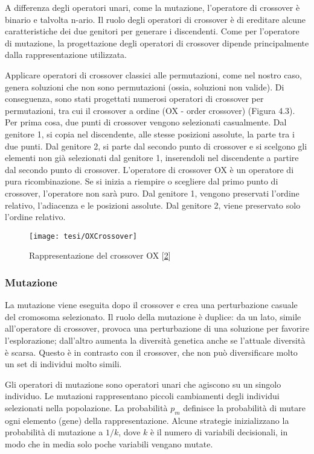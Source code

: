 A differenza degli operatori unari, come la mutazione, l'operatore di crossover è binario e talvolta n-ario. Il ruolo degli operatori di crossover è di ereditare alcune caratteristiche dei due genitori per generare i discendenti. Come per l'operatore di mutazione, la progettazione degli operatori di crossover dipende principalmente dalla rappresentazione utilizzata.

Applicare operatori di crossover classici alle permutazioni, come nel nostro caso, genera soluzioni che non sono permutazioni (ossia, soluzioni non valide). Di conseguenza, sono stati progettati numerosi operatori di crossover per permutazioni, tra cui il crossover a ordine (OX - order crossover) (Figura 4.3). Per prima cosa, due punti di crossover vengono selezionati casualmente. Dal genitore 1, si copia nel discendente, alle stesse posizioni assolute, la parte tra i due punti. Dal genitore 2, si parte dal secondo punto di crossover e si scelgono gli elementi non già selezionati dal genitore 1, inserendoli nel discendente a partire dal secondo punto di crossover. L'operatore di crossover OX è un operatore di pura ricombinazione. Se si inizia a riempire o scegliere dal primo punto di crossover, l'operatore non sarà puro. Dal genitore 1, vengono preservati l'ordine relativo, l'adiacenza e le posizioni assolute. Dal genitore 2, viene preservato solo l'ordine relativo. 

\begin{figure}[!ht] 
    \centering 
    \texttt{[image: tesi/OXCrossover]} 
    \caption[Rappresentazione del crossover OX]{Rappresentazione del crossover OX [\hyperlink{bibliografia}{2}]}
\end{figure}

\subsubsection{Mutazione}
La mutazione viene eseguita dopo il crossover e crea una perturbazione casuale del cromosoma selezionato. Il ruolo della mutazione è duplice: da un lato, simile all'operatore di crossover, provoca una perturbazione di una soluzione per favorire l'esplorazione; dall'altro aumenta la diversità genetica anche se l'attuale diversità è scarsa. Questo è in contrasto con il crossover, che non può diversificare molto un set di individui molto simili.

Gli operatori di mutazione sono operatori unari che agiscono su un singolo individuo. Le mutazioni rappresentano piccoli cambiamenti degli individui selezionati nella popolazione. La probabilità $p_m$ definisce la probabilità di mutare ogni elemento (gene) della rappresentazione. Alcune strategie inizializzano la probabilità di mutazione a $1/k$, dove $k$ è il numero di variabili decisionali, in modo che in media solo poche variabili vengano mutate.

